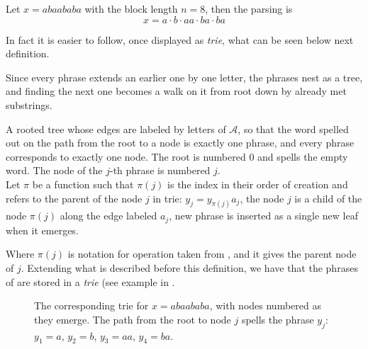 \begin{example}
\label{ex:incremental-parsing}
    Let \(x = abaababa\) with the block length \(n = 8\), then the parsing is
    \[
      x = a \cdot b \cdot aa \cdot ba \cdot ba
    \]
\end{example}
\noindent In fact it is easier to follow, once displayed as \emph{trie}, what can be seen below next definition.

Since every phrase extends an earlier one by one letter, the phrases nest as a tree, and finding the next one becomes a walk on it from root down by already met substrings.
\begin{definition}
\label{def:dictionary-trie}
    A rooted tree whose edges are labeled by letters of \(\mathcal{A}\), so that the word spelled out on the path from the root to a node is exactly one phrase, and every phrase corresponds to exactly one node. The root is numbered \(0\) and spells the empty word. The node of the \(j\)-th phrase is numbered \(j\). \\
    Let \(\pi\) be a function such that \(\pi(j)\) is the index in their order of creation and refers to the parent of the node \(j\) in trie: \(y_j = y_{\pi(j)} a_j\), the node \(j\) is a child of the node \(\pi(j)\) along the edge labeled \(a_j\), new phrase is inserted as a single new leaf when it emerges.
\end{definition}
Where \(\pi(j)\) is notation for operation taken from \cite{ziv1978}, and it gives the parent node of \(j\). Extending what is described before this definition, we have that the phrases of  are stored in a \emph{trie} (see example in .

\noindent
\begin{figure}[H]
    \centering
    \caption{The corresponding trie for \(x = abaababa\), with nodes numbered as they emerge. The path from the root to node \(j\) spells the phrase \(y_j\): \(y_1 = a\), \(y_2 = b\), \(y_3 = aa\), \(y_4 = ba\).}
    \label{fig:lz78-trie}
\end{figure}


